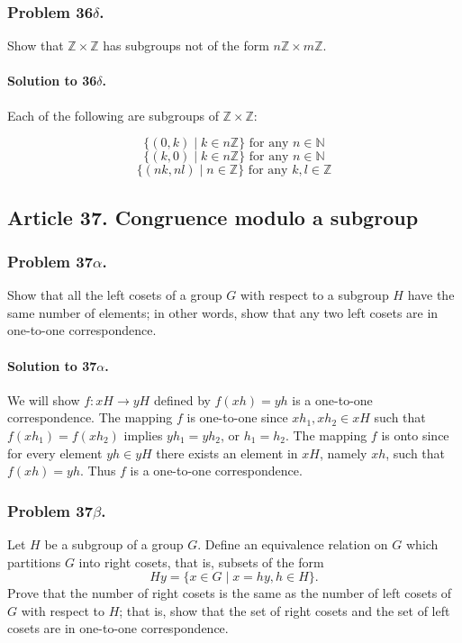 \subsubsection{Problem 36$\delta$.}
Show that $\mathbb{Z} \times \mathbb{Z}$ has subgroups not of the form
$n\mathbb{Z} \times m\mathbb{Z}$.

\paragraph*{Solution to 36$\delta$.}
Each of the following are subgroups of $\mathbb{Z} \times \mathbb{Z}$:

$$\{ (0, k) \mid k \in n\mathbb{Z} \} \mbox{ for any } n \in \mathbb{N}$$
$$\{ (k, 0) \mid k \in n\mathbb{Z} \} \mbox{ for any } n \in \mathbb{N}$$
$$\{ (nk, nl) \mid n \in \mathbb{Z} \} \mbox{ for any } k, l \in \mathbb{Z} $$
\subsection{Article 37. Congruence modulo a subgroup}
\subsubsection{Problem 37$\alpha$.}
Show that all the left cosets of a group $G$ with respect to a subgroup $H$
have the same number of elements; in other words, show that any two left cosets
are in one-to-one correspondence.

\paragraph*{Solution to 37$\alpha$.}
We will show $f : xH \rightarrow yH$ defined by $f (xh) = yh$ is a one-to-one
correspondence. The mapping $f$ is one-to-one since $xh_1, xh_2 \in xH$ such that
$f(xh_1)= f(xh_2) $ implies $yh_1 = yh_2$, or $h_1 = h_2$. The mapping $f$ is onto
since for every element $yh \in yH$ there exists an element in $xH$, namely $xh$,
such that $f (xh) = yh$. Thus $f$ is a one-to-one correspondence.

\subsubsection{Problem 37$\beta$.}
Let $H$ be a subgroup of a group $G$. Define an equivalence relation on $G$
which partitions $G$ into right cosets, that is, subsets of the form
$$Hy = \{ x \in G \mid x = h y, h \in H \}. $$
Prove that the number of right cosets is the same as the number of left cosets
of $G$ with respect to $H$; that is, show that the set of right cosets and the
set of left cosets are in one-to-one correspondence.

